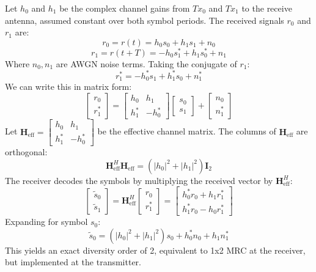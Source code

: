 \documentclass[12pt,a4paper]{article}
\begin{document}
Let $h_0$ and $h_1$ be the complex channel gains from $Tx_0$ and $Tx_1$ to the receive antenna, assumed constant over both symbol periods. The received signals $r_0$ and $r_1$ are:
\begin{equation}
  r_0 = r(t) = h_0 s_0 + h_1 s_1 + n_0
\end{equation}
\begin{equation}
  r_1 = r(t+T) = -h_0 s_1^* + h_1 s_0^* + n_1
\end{equation}
Where $n_0, n_1$ are AWGN noise terms. Taking the conjugate of $r_1$:
\begin{equation}
  r_1^* = -h_0^* s_1 + h_1^* s_0 + n_1^*
\end{equation}
We can write this in matrix form:
\begin{equation}
  \begin{bmatrix} r_0 \\ r_1^* \end{bmatrix} = \begin{bmatrix} h_0 & h_1 \\ h_1^* & -h_0^* \end{bmatrix} \begin{bmatrix} s_0 \\ s_1 \end{bmatrix} + \begin{bmatrix} n_0 \\ n_1^* \end{bmatrix}
\end{equation}
Let $\mathbf{H}_{\text{eff}} = \begin{bmatrix} h_0 & h_1 \\ h_1^* & -h_0^* \end{bmatrix}$ be the effective channel matrix. The columns of $\mathbf{H}_{\text{eff}}$ are orthogonal:
\begin{equation}
  \mathbf{H}_{\text{eff}}^H \mathbf{H}_{\text{eff}} = \left( |h_0|^2 + |h_1|^2 \right) \mathbf{I}_2
\end{equation}
The receiver decodes the symbols by multiplying the received vector by $\mathbf{H}_{\text{eff}}^H$:
\begin{equation}
  \begin{bmatrix} \tilde{s}_0 \\ \tilde{s}_1 \end{bmatrix} = \mathbf{H}_{\text{eff}}^H \begin{bmatrix} r_0 \\ r_1^* \end{bmatrix} = \begin{bmatrix} h_0^* r_0 + h_1 r_1^* \\ h_1^* r_0 - h_0 r_1^* \end{bmatrix}
\end{equation}
Expanding for symbol $s_0$:
\begin{equation}
  \tilde{s}_0 = \left( |h_0|^2 + |h_1|^2 \right) s_0 + h_0^* n_0 + h_1 n_1^*
\end{equation}
This yields an exact diversity order of 2, equivalent to 1x2 MRC at the receiver, but implemented at the transmitter.
\end{document}
